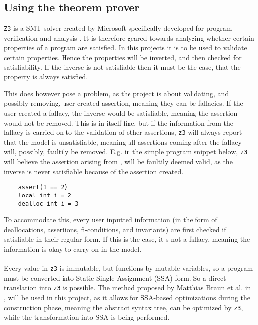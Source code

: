 \subsection{Using the theorem prover \rr}
\texttt{Z3} is a SMT solver created by Microsoft specifically developed
for program verification and analysis \cite{z3:microsoft}. It is therefore geared towards
analyzing whether certain properties of a program are satisfied. In this projects it is to be
used to validate certain properties. Hence the properties will be inverted, and then checked for
satisfiability. If the inverse is not satisfiable then it must be the case, that the property
is always satisfied.

This does however pose a problem, as the project is about validating, and possibly removing,
user created assertion, meaning they can be fallacies. If the user created a fallacy, the inverse
would be satisfiable, meaning the assertion would not be removed. This is in itself fine, but if
the information from the fallacy is carried on to the validation of other assertions, \texttt{z3}
will always report that the model is unsatisfiable, meaning all assertions coming after the fallacy
will, possibly, faultily be removed. E.g. in the simple program snippet below, \texttt{z3} will
believe the assertion arising from , will be faultily deemed valid, as the
inverse is never satisfiable because of the assertion created.

\begin{lstlisting}
    assert(1 == 2)
    local int i = 2
    dealloc int i = 3
\end{lstlisting}
\noindent
To accommodate this, every user inputted information (in the form of deallocations, assertions,
fi-conditions, and invariants) are first checked if satisfiable in their regular form. If this is
the case, it s not a fallacy, meaning the information is okay to carry on in the model.
\\
\\
Every value in \texttt{z3} is immutable, but \lan functions by mutable variables, so a \lan program
must be converted into Static Single Assignment (SSA) form. So a direct translation into
\texttt{z3} is possible. The method proposed by Matthias Braun et al. in \cite{SSA}, will be used
in this project, as it allows for SSA-based optimizations during the construction phase, meaning
the abstract syntax tree, can be optimized by \texttt{z3}, while the transformation into SSA is
being performed.

